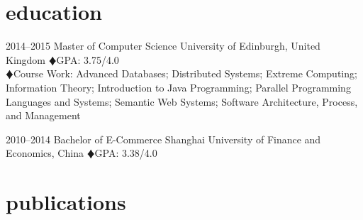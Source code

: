 \documentclass[]{friggeri-cv} %
\begin{document}

\section{education}

\begin{entrylist}
\entry
{2014--2015}
{Master {\normalfont of Computer Science}}
{University of Edinburgh, United Kingdom}
{
{\color{red} $\vardiamondsuit$}GPA: 3.75/4.0\\
{\color{red} $\vardiamondsuit$}Course Work: Advanced Databases; Distributed Systems; Extreme Computing; Information Theory; Introduction to Java Programming; Parallel Programming Languages and Systems; Semantic Web Systems; Software Architecture, Process, and Management
}

\entry
{2010--2014}
{Bachelor {\normalfont of E-Commerce}}
{Shanghai University of Finance and Economics, China}
{
{\color{red} $\vardiamondsuit$}GPA: 3.38/4.0\\
}
\end{entrylist}

%
\section{publications}

\end{document}
